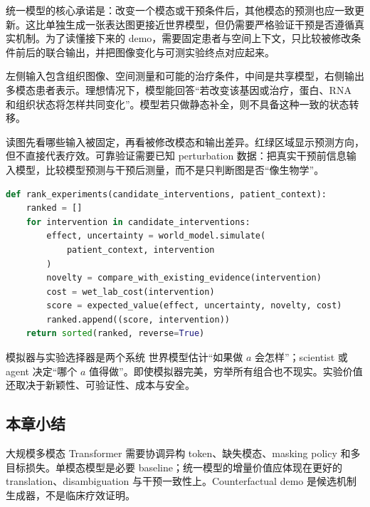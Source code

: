 统一模型的核心承诺是：改变一个模态或干预条件后，其他模态的预测也应一致更新。这比单独生成一张表达图更接近世界模型，但仍需要严格验证干预是否遵循真实机制。为了读懂接下来的 demo，需要固定患者与空间上下文，只比较被修改条件前后的联合输出，并把图像变化与可测实验终点对应起来。


左侧输入包含组织图像、空间测量和可能的治疗条件，中间是共享模型，右侧输出多模态患者表示。理想情况下，模型能回答“若改变该基因或治疗，蛋白、RNA 和组织状态将怎样共同变化”。模型若只做静态补全，则不具备这种一致的状态转移。


读图先看哪些输入被固定，再看被修改模态和输出差异。红绿区域显示预测方向，但不直接代表疗效。可靠验证需要已知 perturbation 数据：把真实干预前信息输入模型，比较模型预测与干预后测量，而不是只判断图是否“像生物学”。

\begin{lstlisting}[language=Python,caption={实验优先级：把模型效应、不确定性与现实验证成本同时纳入}]
def rank_experiments(candidate_interventions, patient_context):
    ranked = []
    for intervention in candidate_interventions:
        effect, uncertainty = world_model.simulate(
            patient_context, intervention
        )
        novelty = compare_with_existing_evidence(intervention)
        cost = wet_lab_cost(intervention)
        score = expected_value(effect, uncertainty, novelty, cost)
        ranked.append((score, intervention))
    return sorted(ranked, reverse=True)
\end{lstlisting}

\begin{importantbox}{模拟器与实验选择器是两个系统}
世界模型估计“如果做 $a$ 会怎样”；scientist 或 agent 决定“哪个 $a$ 值得做”。即使模拟器完美，穷举所有组合也不现实。实验价值还取决于新颖性、可验证性、成本与安全。
\end{importantbox}

\subsection{本章小结}

大规模多模态 Transformer 需要协调异构 token、缺失模态、masking policy 和多目标损失。单模态模型是必要 baseline；统一模型的增量价值应体现在更好的 translation、disambiguation 与干预一致性上。Counterfactual demo 是候选机制生成器，不是临床疗效证明。

